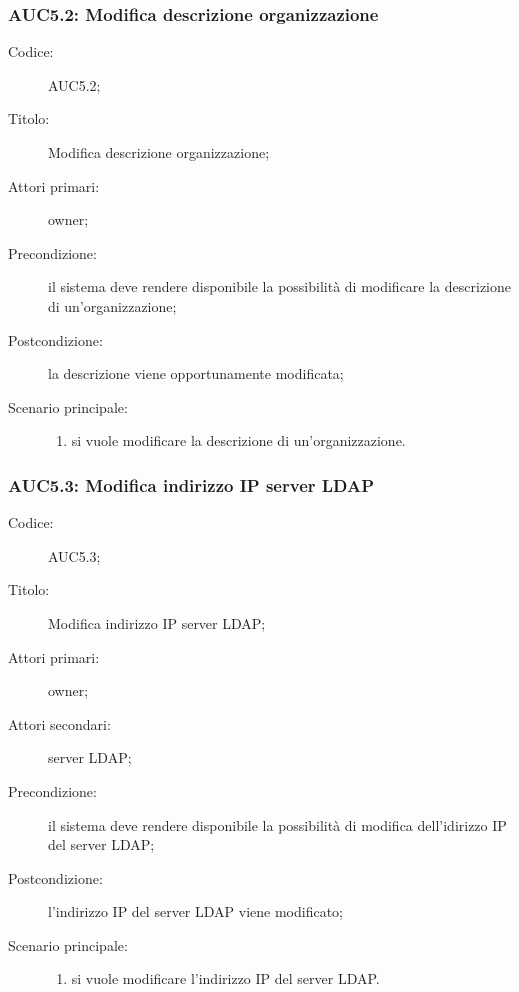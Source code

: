 \documentclass[../../../analisi-dei-requisiti.tex]{subfiles}
\begin{document}
\subsubsection{AUC5.2: Modifica descrizione organizzazione}%
\label{subs:AUC5.2}
\begin{description}
  \item[Codice:] AUC5.2;
  \item[Titolo:] Modifica descrizione organizzazione;
  \item[Attori primari:] owner;
  \item[Precondizione:] il sistema deve rendere disponibile la possibilità di modificare la descrizione di un'organizzazione;
  \item[Postcondizione:] la descrizione viene opportunamente modificata;
  \item[Scenario principale:]
        \begin{enumerate}
          \item si vuole modificare la descrizione di un'organizzazione.
        \end{enumerate}
\end{description}


\subsubsection{AUC5.3: Modifica indirizzo IP server LDAP}%
\label{subs:AUC5.3}
\begin{description}
  \item[Codice:] AUC5.3;
  \item[Titolo:] Modifica indirizzo IP server LDAP\@;
  \item[Attori primari:] owner;
  \item[Attori secondari:] server LDAP\@;
  \item[Precondizione:] il sistema deve rendere disponibile la possibilità di modifica dell'idirizzo IP del server LDAP\@;
  \item[Postcondizione:] l'indirizzo IP del server LDAP viene modificato;
  \item[Scenario principale:]
        \begin{enumerate}
          \item si vuole modificare l'indirizzo IP del server LDAP\@.
        \end{enumerate}
\end{description}
\end{document}
